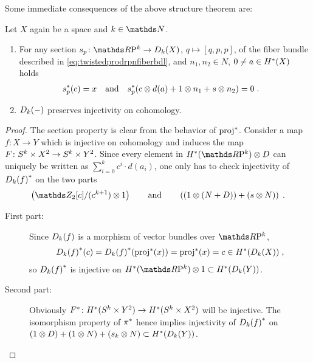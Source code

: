 Some immediate consequences of the above structure theorem are:
\begin{Cor}
  Let $X$ again be a space and $k\in\Nat$.
  \begin{enumerate}
  \item
    For any section $s_p\colon\RP k\to\Twistedprod{k}{X}$, $q\mapsto[q,p,p]$,
    of the fiber bundle described in
    \eqref{eq:twistedprodrpnfiberbdl}, and $n_1,n_2\in N$, $0\neq a\in H^*(X)$ holds
    \begin{align}\label{eq:twistedprodcohom:section}
      {s}^*_p(c) &= x
      &\text{and}&
      &{s}^*_p(c\otimes d(a) + 1\otimes n_1 + s\otimes n_2) &= 0
                                                              \;.
    \end{align}
  \item\label{item:twistedprod:preservescohominj}
    $D_{k}({-})$ preserves injectivity on cohomology.
  \end{enumerate}
  \begin{proof}
    The section property is clear from the behavior of ${\mathrm{proj}}^*$.
    Consider a map $f\colon X\to Y$ which is injective on cohomology
    and induces the map
    $F\colon S^{k}\times X^2\to S^{k}\times Y^2$.
    Since every element in $\H^*(\RP k)\otimes D$ can uniquely be
    written as $\sum_{i=0}^k c^i\cdot d(a_i)$,
    one only has to check injectivity of ${D_{k}({f})}^*$ on
    the two parts
    \begin{gather*}
      \left( \Zmod2[c]/(c^{k+1})\otimes 1 \right)
      \qquad\text{and}\qquad
      \left(
        (1\otimes (N+D)) + (s\otimes N)
      \right)
      \;.
    \end{gather*}
    \begin{description}
    \item[First part:]
      Since $D_{k}({f})$ is a morphism of vector bundles over
      $\RP k$,
      \begin{gather*}
        {D_{k}({f})}^*(c)
        = {D_{k}({f})}^*({\mathrm{proj}}^*(x))
        = {\mathrm{proj}}^*(x)
        = c
        \in H^*(D_{k}({X}))
        \;,
      \end{gather*}
      so ${D_{k}({f})}^*$ is injective on
      $\H^*(\RP k)\otimes 1\subset\H^*(\Twistedprod k Y)$.
    \item[Second part:]
      Obviously
      ${F}^*\colon H^*(S^{k}\times Y^2)\to H^*(S^{k}\times X^2)$ 
      will be injective. The isomorphism property of ${\pi}^*$ hence
      implies injectivity of ${D_{k}({f})}^*$ on
      $(1\otimes D)+(1\otimes N)+(s_k\otimes N)\subset H^*(D_{k}({Y}))$.
      \qedhere
    \end{description}
  \end{proof}
\end{Cor}

